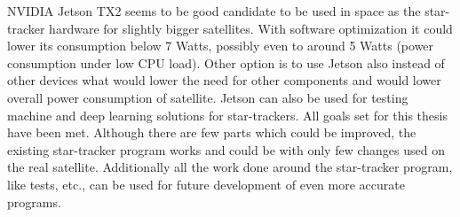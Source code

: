 \documentclass[12pt,a4paper,twoside]{article}
\begin{document}
NVIDIA Jetson TX2 seems to be good candidate to be used in space as the star-tracker hardware for slightly bigger satellites. With software optimization it could lower its consumption below 7 Watts, possibly even to around 5 Watts (power consumption under low CPU load). Other option is to use Jetson also instead of other devices what would lower the need for other components and would lower overall power consumption of satellite. Jetson can also be used for testing machine and deep learning solutions for star-trackers.
All goals set for this thesis have been met. Although there are few parts which could be improved, the existing star-tracker program works and could be with only few changes used on the real satellite. Additionally all the work done around the star-tracker program, like tests, etc., can be used for future development of even more accurate programs.


\newpage






\newpage

\listoftables

\newpage

\listoffigures

\newpage
\end{document}
